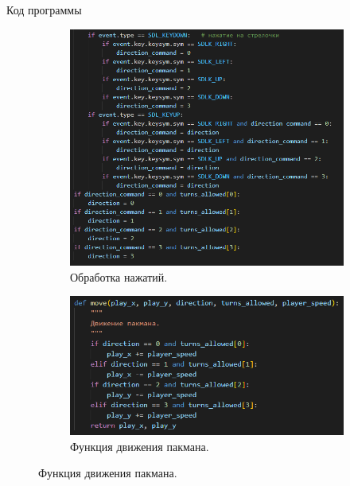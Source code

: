 \documentclass[12pt,a4paper,mathserif]{beamer}
\begin{document}
\begin{frame}{Код программы}
    \begin{figure}
    \centering
    \begin{subfigure}{.5\textwidth}
      \centering
      \includegraphics[width=.98\linewidth]{src/code1.png}
      \caption{Обработка нажатий.}
    \end{subfigure}%
    \begin{subfigure}{.5\textwidth}
      \centering
      \includegraphics[width=.98\linewidth]{src/code2.png}
      \caption{Функция движения пакмана.}
    \end{subfigure}
    \end{figure}
\end{frame}
\end{document}
